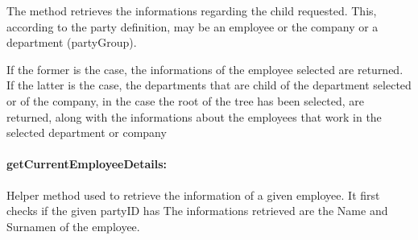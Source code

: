 The method retrieves the informations regarding the child requested. This, according to the party definition, may be an employee or the company or a department (partyGroup).

If the former is the case, the informations of the employee selected are returned. If the latter is the case, the departments that are child of the department selected or of the company, in the case the root of the tree has been selected, are returned, along with the informations about the employees that work in the selected department or company



\paragraph{getCurrentEmployeeDetails:}

Helper method used to retrieve the information of a given employee.
It first checks if the given partyID has 
The informations retrieved are the Name and Surnamen of the employee.





